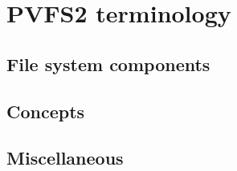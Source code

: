\section{PVFS2 terminology}

\subsection{File system components}

\subsection{Concepts}

\subsection{Miscellaneous}
